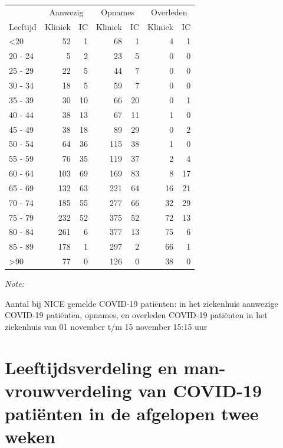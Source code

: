\documentclass[
  english,
  man,floatsintext]{apa6}
\begin{document}
\begin{table}
\centering\begingroup\fontsize{10}{12}\selectfont

\begin{threeparttable}
\begin{tabular}{lrrrrrr}
\toprule
\multicolumn{1}{c}{ } & \multicolumn{2}{c}{Aanwezig} & \multicolumn{2}{c}{Opnames} & \multicolumn{2}{c}{Overleden} \\
\cmidrule(l{3pt}r{3pt}){2-3} \cmidrule(l{3pt}r{3pt}){4-5} \cmidrule(l{3pt}r{3pt}){6-7}
Leeftijd & Kliniek & IC & Kliniek & IC & Kliniek & IC\\
\midrule
<20 & 52 & 1 & 68 & 1 & 4 & 1\\
20 - 24 & 5 & 2 & 23 & 5 & 0 & 0\\
25 - 29 & 22 & 5 & 44 & 7 & 0 & 0\\
30 - 34 & 18 & 5 & 59 & 7 & 0 & 0\\
35 - 39 & 30 & 10 & 66 & 20 & 0 & 1\\
40 - 44 & 38 & 13 & 67 & 11 & 1 & 0\\
45 - 49 & 38 & 18 & 89 & 29 & 0 & 2\\
50 - 54 & 64 & 36 & 115 & 38 & 1 & 0\\
55 - 59 & 76 & 35 & 119 & 37 & 2 & 4\\
60 - 64 & 103 & 69 & 169 & 83 & 8 & 17\\
65 - 69 & 132 & 63 & 221 & 64 & 16 & 21\\
70 - 74 & 185 & 55 & 277 & 66 & 32 & 29\\
75 - 79 & 232 & 52 & 375 & 52 & 72 & 13\\
80 - 84 & 261 & 6 & 377 & 13 & 75 & 6\\
85 - 89 & 178 & 1 & 297 & 2 & 66 & 1\\
>90 & 77 & 0 & 126 & 0 & 38 & 0\\
\bottomrule
\end{tabular}
\begin{tablenotes}
\item \textit{Note: } 
\item Aantal bij NICE gemelde COVID-19 patiënten: in het ziekenhuis aanwezige COVID-19 patiënten, opnames, en overleden COVID-19 patiënten in het ziekenhuis van 01 november t/m 15 november 15:15 uur
\end{tablenotes}
\end{threeparttable}
\endgroup{}
\end{table}

\newpage

\hypertarget{leeftijdsverdeling-en-man-vrouwverdeling-van-covid-19-patiuxebnten-in-de-afgelopen-twee-weken}{%
\section{Leeftijdsverdeling en man-vrouwverdeling van COVID-19 patiënten in de afgelopen twee weken}\label{leeftijdsverdeling-en-man-vrouwverdeling-van-covid-19-patiuxebnten-in-de-afgelopen-twee-weken}}
\end{document}
